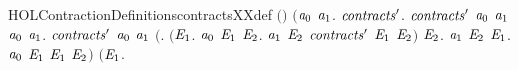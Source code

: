 \begin{SaveVerbatim}{HOLContractionDefinitionscontractsXXdef}
\HOLTokenTurnstile{} \ensuremath{(}\ensuremath{)} \HOLSymConst{\ensuremath{=}}
   \ensuremath{(}\HOLTokenLambda{}\ensuremath{\HOLBoundVar{a}\sb{\mathrm{0}}} \ensuremath{\HOLBoundVar{a}\sb{\mathrm{1}}}.
        \HOLSymConst{\HOLTokenExists{}}\ensuremath{\HOLBoundVar{contracts}\sp{\prime}}.
            \ensuremath{\HOLBoundVar{contracts}\sp{\prime}} \ensuremath{\HOLBoundVar{a}\sb{\mathrm{0}}} \ensuremath{\HOLBoundVar{a}\sb{\mathrm{1}}} \HOLSymConst{\HOLTokenConj{}}
            \HOLSymConst{\HOLTokenForall{}}\ensuremath{\HOLBoundVar{a}\sb{\mathrm{0}}} \ensuremath{\HOLBoundVar{a}\sb{\mathrm{1}}}.
                \ensuremath{\HOLBoundVar{contracts}\sp{\prime}} \ensuremath{\HOLBoundVar{a}\sb{\mathrm{0}}} \ensuremath{\HOLBoundVar{a}\sb{\mathrm{1}}} \HOLSymConst{\HOLTokenImp{}}
                \ensuremath{(}\HOLSymConst{\HOLTokenForall{}}.
                     \ensuremath{(}\HOLSymConst{\HOLTokenForall{}}\ensuremath{\HOLBoundVar{E}\sb{\mathrm{1}}}.
                          \ensuremath{\HOLBoundVar{a}\sb{\mathrm{0}}} \HOLTokenTransBegin{} \HOLTokenTransEnd \ensuremath{\HOLBoundVar{E}\sb{\mathrm{1}}} \HOLSymConst{\HOLTokenImp{}}
                          \HOLSymConst{\HOLTokenExists{}}\ensuremath{\HOLBoundVar{E}\sb{\mathrm{2}}}.
                              \ensuremath{\HOLBoundVar{a}\sb{\mathrm{1}}} \HOLTokenTransBegin{} \HOLTokenTransEnd \ensuremath{\HOLBoundVar{E}\sb{\mathrm{2}}} \HOLSymConst{\HOLTokenConj{}} \ensuremath{\HOLBoundVar{contracts}\sp{\prime}} \ensuremath{\HOLBoundVar{E}\sb{\mathrm{1}}} \ensuremath{\HOLBoundVar{E}\sb{\mathrm{2}}}\ensuremath{)} \HOLSymConst{\HOLTokenConj{}}
                     \HOLSymConst{\HOLTokenForall{}}\ensuremath{\HOLBoundVar{E}\sb{\mathrm{2}}}.
                         \ensuremath{\HOLBoundVar{a}\sb{\mathrm{1}}} \HOLTokenTransBegin{} \HOLTokenTransEnd \ensuremath{\HOLBoundVar{E}\sb{\mathrm{2}}} \HOLSymConst{\HOLTokenImp{}}
                         \HOLSymConst{\HOLTokenExists{}}\ensuremath{\HOLBoundVar{E}\sb{\mathrm{1}}}. \ensuremath{\HOLBoundVar{a}\sb{\mathrm{0}}} \HOLTokenWeakTransBegin{} \HOLTokenWeakTransEnd \ensuremath{\HOLBoundVar{E}\sb{\mathrm{1}}} \HOLSymConst{\HOLTokenConj{}}  \ensuremath{\HOLBoundVar{E}\sb{\mathrm{1}}} \ensuremath{\HOLBoundVar{E}\sb{\mathrm{2}}}\ensuremath{)} \HOLSymConst{\HOLTokenConj{}}
                \ensuremath{(}\HOLSymConst{\HOLTokenForall{}}\ensuremath{\HOLBoundVar{E}\sb{\mathrm{1}}}.

\end{SaveVerbatim}
